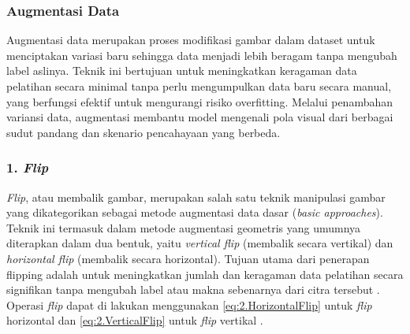 
\subsubsection{Augmentasi Data} \label{II.TeoriAugmentasiData}
Augmentasi data merupakan proses modifikasi gambar dalam dataset untuk menciptakan variasi baru sehingga data menjadi lebih beragam tanpa mengubah label aslinya. Teknik ini bertujuan untuk meningkatkan keragaman data pelatihan secara minimal tanpa perlu mengumpulkan data baru secara manual, yang berfungsi efektif untuk mengurangi risiko overfitting. Melalui penambahan variansi data, augmentasi membantu model mengenali pola visual dari berbagai sudut pandang dan skenario pencahayaan yang berbeda.

\subsubsection*{\textnormal{1. \textit{Flip}}} \label{II.TeoriFlip}
\textit{Flip}, atau membalik gambar, merupakan salah satu teknik manipulasi gambar yang dikategorikan sebagai metode augmentasi data dasar (\textit{basic approaches}). Teknik ini termasuk dalam metode augmentasi geometris yang umumnya diterapkan dalam dua bentuk, yaitu \textit{vertical flip} (membalik secara vertikal) dan \textit{horizontal flip} (membalik secara horizontal). Tujuan utama dari penerapan flipping adalah untuk meningkatkan jumlah dan keragaman data pelatihan secara signifikan tanpa mengubah label atau makna sebenarnya dari citra tersebut \cite{flip}. Operasi \textit{flip} dapat di lakukan menggunakan \ref{eq:2.HorizontalFlip} untuk \textit{flip} horizontal dan \ref{eq:2.VerticalFlip} untuk \textit{flip} vertikal \cite{thesisNova}. \par

